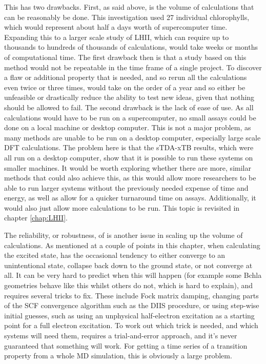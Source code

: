 This has two drawbacks. First, as said above, is the volume of calculations that
can be reasonably be done. This investigation used 27 individual chlorophylls, 
which would represent about half a days worth of supercomputer time. Expanding
this to a larger scale study of LHII, which can require up to thousands to hundreds
of thousands of calculations, would take weeks or months of computational time.
The first drawback then is that a study based on this method would not be repeatable
in the time frame of a single project. To discover a flaw or additional property 
that is needed, and so rerun all the calculations even twice or three times, would
take on the order of a year and so either be unfeasible or drastically reduce the
ability to test new ideas, given that nothing should be allowed to fail.
The second drawback is the lack of ease of use. As all calculations would have to
be run on a supercomputer, no small assays could be done on a local machine or desktop
computer. This is not a major problem, as many methods are unable to be run on a 
desktop computer, especially large scale DFT calculations. The problem here is that
the sTDA-xTB results, which were all run on a desktop computer, show that it is
possible to run these systems on smaller machines. It would be worth exploring
whether there are more, similar methods that could also achieve this, as this would
allow more researchers to be able to run larger systems without the previously needed
expense of time and energy, as well as allow for a quicker turnaround time on assays.
Additionally, it would also just allow more calculations to be run. This topic
is revisited in chapter \ref*{chap:LHII}.

The reliability, or robustness, of \dscf is another issue in scaling up the volume
of calculations. As mentioned at a couple of points in this chapter, when calculating
the excited state, \dscf has the occasional tendency to either converge to an
unintentional state, collapse back down to the ground state, or not converge at all.
It can be very hard to predict when this will happen (for example some Bchla 
geometries behave like this whilst others do not, which is hard to explain), and
requires several tricks to fix. These include Fock matrix damping, changing parts of
the SCF convergence algorithm such as the DIIS procedure, or using step-wise
initial guesses, such as using an unphysical half-electron excitation as a starting
point for a full electron excitation. To work out which trick is needed, and which
systems will need them, requires a trial-and-error approach, and it's never guaranteed
that something will work. For getting a time series of a transition property from
a whole MD simulation, this is obviously a large problem.

